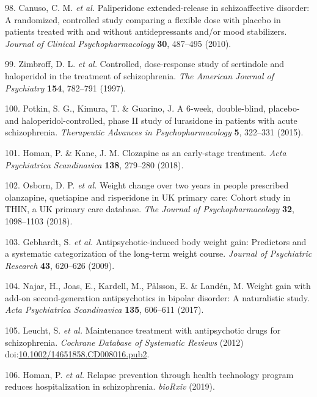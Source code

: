 \documentclass[9pt,english,,jou,floatsintext]{apa6}
\begin{document}
\hypertarget{ref-Canuso2010b}{}
98. Canuso, C. M. \emph{et al.} Paliperidone extended-release in
schizoaffective disorder: A randomized, controlled study comparing a
flexible dose with placebo in patients treated with and without
antidepressants and/or mood stabilizers. \emph{Journal of Clinical
Psychopharmacology} \textbf{30}, 487--495 (2010).

\hypertarget{ref-Zimbroff1997}{}
99. Zimbroff, D. L. \emph{et al.} Controlled, dose-response study of
sertindole and haloperidol in the treatment of schizophrenia. \emph{The
American Journal of Psychiatry} \textbf{154}, 782--791 (1997).

\hypertarget{ref-Potkin2015}{}
100. Potkin, S. G., Kimura, T. \& Guarino, J. A 6-week, double-blind,
placebo- and haloperidol-controlled, phase II study of lurasidone in
patients with acute schizophrenia. \emph{Therapeutic Advances in
Psychopharmacology} \textbf{5}, 322--331 (2015).

\hypertarget{ref-Homan2018}{}
101. Homan, P. \& Kane, J. M. Clozapine as an early-stage treatment.
\emph{Acta Psychiatrica Scandinavica} \textbf{138}, 279--280 (2018).

\hypertarget{ref-Osborn2018}{}
102. Osborn, D. P. \emph{et al.} Weight change over two years in people
prescribed olanzapine, quetiapine and risperidone in UK primary care:
Cohort study in THIN, a UK primary care database. \emph{The Journal of
Psychopharmacology} \textbf{32}, 1098--1103 (2018).

\hypertarget{ref-Gebhardt2009}{}
103. Gebhardt, S. \emph{et al.} Antipsychotic-induced body weight gain:
Predictors and a systematic categorization of the long-term weight
course. \emph{Journal of Psychiatric Research} \textbf{43}, 620--626
(2009).

\hypertarget{ref-Najar2017}{}
104. Najar, H., Joas, E., Kardell, M., Pålsson, E. \& Landén, M. Weight
gain with add-on second-generation antipsychotics in bipolar disorder: A
naturalistic study. \emph{Acta Psychiatrica Scandinavica} \textbf{135},
606--611 (2017).

\hypertarget{ref-Leucht2012a}{}
105. Leucht, S. \emph{et al.} Maintenance treatment with antipsychotic
drugs for schizophrenia. \emph{Cochrane Database of Systematic Reviews}
(2012)
doi:\href{https://doi.org/10.1002/14651858.CD008016.pub2}{10.1002/14651858.CD008016.pub2}.

\hypertarget{ref-Homan2019h}{}
106. Homan, P. \emph{et al.} Relapse prevention through health
technology program reduces hospitalization in schizophrenia.
\emph{bioRxiv} (2019).
\end{document}
